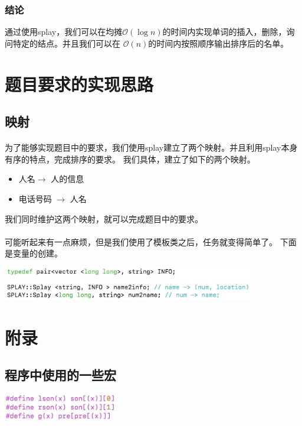 \documentclass{article}
\begin{document}
		\subsubsection{结论}
			通过使用splay，我们可以在均摊$\mathcal{O}(\log n)$的时间内实现单词的插入，删除，询问特定的结点。并且我们可以在
			$\mathcal{O}(n)$的时间内按照顺序输出排序后的名单。
\section{题目要求的实现思路}
	\subsection{映射}
		\paragraph{}
			为了能够实现题目中的要求，我们使用splay建立了两个映射。并且利用splay本身有序的特点，完成排序的要求。
			我们具体，建立了如下的两个映射。
			\begin{itemize}
				\item 人名$\to$ 人的信息
				\item 电话号码 $\to$ 人名
			\end{itemize}
			我们同时维护这两个映射，就可以完成题目中的要求。
		\paragraph{}
			可能听起来有一点麻烦，但是我们使用了模板类之后，任务就变得简单了。
			下面是变量的创建。
			\begin{center}
			\includegraphics[width = 11cm]{def.jpeg}
			\end{center}
\section{附录}
	\subsection{程序中使用的一些宏}
			\includegraphics[width = 5cm]{define.jpeg}
		
\end{document}
